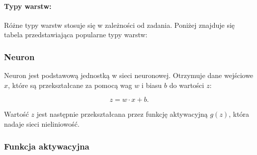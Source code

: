 \paragraph{Typy warstw:}
Różne typy warstw stosuje się w zależności od zadania. Poniżej znajduje się tabela przedstawiająca popularne typy warstw:

\begin{table}[ht]
	\centering
	\caption{Rodzaje warstw w sieciach neuronowych}
	\label{tab:layer_types}
	\begin{center}
	\end{center}
\end{table}

\subsubsection{Neuron}

Neuron jest podstawową jednostką w sieci neuronowej. Otrzymuje dane wejściowe \(x\), które są przekształcane za pomocą wag \(w\) i biasu \(b\) do wartości \(z\):

\[
	z = w \cdot x + b.
\]

Wartość \(z\) jest następnie przekształcana przez funkcję aktywacyjną \(g(z)\), która nadaje sieci nieliniowość.

\subsubsection{Funkcja aktywacyjna}

